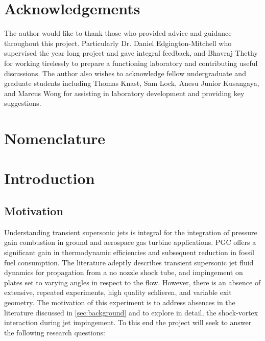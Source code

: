 \section*{Acknowledgements}
The author would like to thank those who provided advice and guidance throughout this project. Particularly Dr. Daniel Edgington-Mitchell who supervised the year long project and gave integral feedback, and Bhavraj Thethy for working tirelessly to prepare a functioning laboratory and contributing useful discussions. The author also wishes to acknowledge fellow undergraduate and graduate students including Thomas Knast, Sam Lock, Anesu Junior Kusangaya, and Marcus Wong for assisting in laboratory development and providing key suggestions.
\newpage
\tableofcontents
\newpage
\listoftables
\newpage
\listoffigures
\newpage
\section*{Nomenclature}

\mbox{}
 
 
\printnomenclature


\newpage
{}
\section{Introduction} 

\subsection{Motivation}
Understanding transient supersonic jets is integral for the integration of pressure gain combustion in ground and aerospace gas turbine applications. PGC offers a significant gain in thermodynamic efficiencies and subsequent reduction in fossil fuel consumption. The literature adeptly describes transient supersonic jet fluid dynamics for propagation from a no nozzle shock tube, and impingement on plates set to varying angles in respect to the flow. However, there is an absence of extensive, repeated experiments, high quality schlieren, and variable exit geometry. The motivation of this experiment is to address  absences in the literature discussed in \ref{sec:background} and to explore in detail, the shock-vortex interaction during jet impingement. To this end the project will seek to answer the following research questions:

